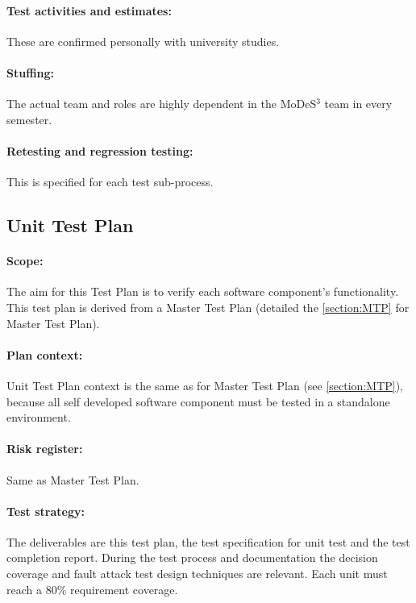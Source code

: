 \paragraph{Test activities and estimates:} These are confirmed personally with university studies.
\paragraph{Stuffing:} The actual team and roles are highly dependent in the MoDeS$^3$ team in every semester.
\paragraph{Retesting and regression testing:} This is specified for each test sub-process.


\subsection{Unit Test Plan}
\paragraph{Scope:} The aim for this Test Plan is to verify each software component's functionality. This test plan is derived from a Master Test Plan (detailed the \autoref{section:MTP} for Master Test Plan). 
\paragraph{Plan context:} Unit Test Plan context is the same as for Master Test Plan (see \autoref{section:MTP}), because all self developed software component must be tested in a standalone environment. 
\paragraph{Risk register:} Same as Master Test Plan.
\paragraph{Test strategy:} The deliverables are this test plan, the test specification for unit test and the test completion report. 
During the test process and documentation the decision coverage and fault attack test design techniques are relevant.
Each unit must reach a 80\%  requirement coverage. 

